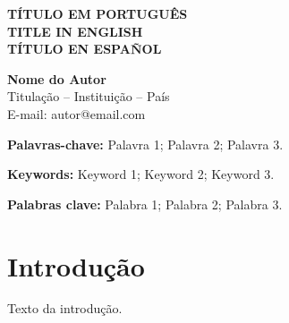 \documentclass[12pt,a4paper]{article}
\begin{document}
\begin{center}
\textbf{TÍTULO EM PORTUGUÊS}\\[0.3cm]
\textbf{TITLE IN ENGLISH}\\[0.3cm]
\textbf{TÍTULO EN ESPAÑOL}
\end{center}

\vspace{0.5cm}

\begin{flushright}
\textbf{Nome do Autor}\\
Titulação – Instituição – País\\
E-mail: autor@email.com
\end{flushright}

\vspace{0.5cm}

\begin{abstract}
\fontsize{10}{12}\selectfont
\justifying
Resumo em português, com no máximo 300 palavras, espaçamento simples, texto justificado e sem recuo.
\end{abstract}

\noindent\textbf{Palavras-chave:} Palavra 1; Palavra 2; Palavra 3.

\vspace{0.3cm}

\begin{abstract}
\fontsize{10}{12}\selectfont
\justifying
Abstract in English.
\end{abstract}

\noindent\textbf{Keywords:} Keyword 1; Keyword 2; Keyword 3.

\vspace{0.3cm}

\begin{abstract}
\fontsize{10}{12}\selectfont
\justifying
Resumen en español.
\end{abstract}

\noindent\textbf{Palabras clave:} Palabra 1; Palabra 2; Palabra 3.

\section{Introdução}

Texto da introdução.
\end{document}

